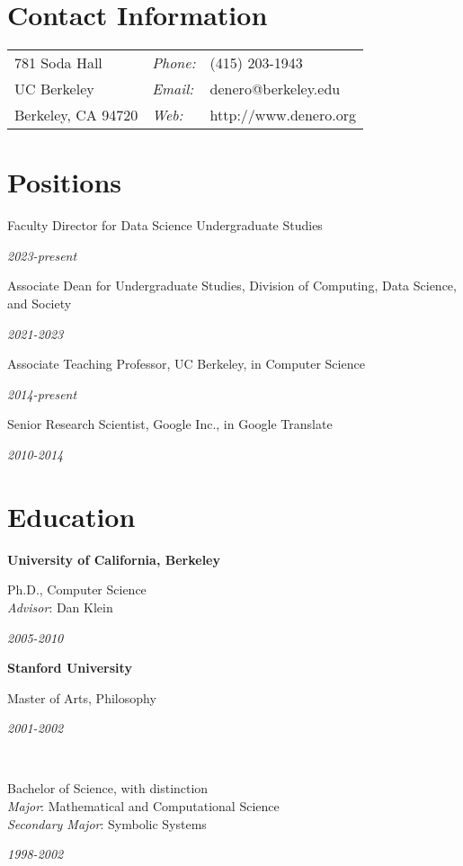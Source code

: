 \documentclass[margin,line]{res}
\newcommand{\dated}[2]{\parbox[t]{4.4in}{#1} \hspace{0.4in}
											 \parbox[t]{1in}{ {\it #2 } } }
\begin{document}

\begin{resume}

\section{\sc Contact Information}
\vspace{.05in}
\begin{tabular}{@{}p{2in}lp{4in}}
781 Soda Hall         & {\it Phone:} & (415) 203-1943        \\
UC Berkeley           & {\it Email:} & denero@berkeley.edu   \\
Berkeley, CA  94720   & {\it Web:}   & http://www.denero.org \\
\end{tabular}

\section{\sc Positions}

	\dated{Faculty Director for Data Science Undergraduate Studies}
	{ 2023-present }

	\dated{Associate Dean for Undergraduate Studies, Division of Computing, Data Science, and Society}
	{ 2021-2023 }

	\dated{Associate Teaching Professor, UC Berkeley, in Computer Science}
	{ 2014-present }

	\dated{Senior Research Scientist, Google Inc., in Google Translate}
	{ 2010-2014 }

\section{\sc Education}

	{\bf University of California, Berkeley} \\
	\dated{Ph.D., Computer Science \\
	\hspace*{1em} {\it Advisor}: Dan Klein}{ 2005-2010 }

	{\bf Stanford University} \\
	\dated{Master of Arts, Philosophy\vspace{0.12in}}{ 2001-2002 } \\
	\dated{Bachelor of Science, with distinction \\
	\hspace*{1em} {\it Major}: Mathematical and Computational Science \\
	\hspace*{1em} {\it Secondary Major}: Symbolic Systems}{ 1998-2002 }


\end{resume}
\end{document}

